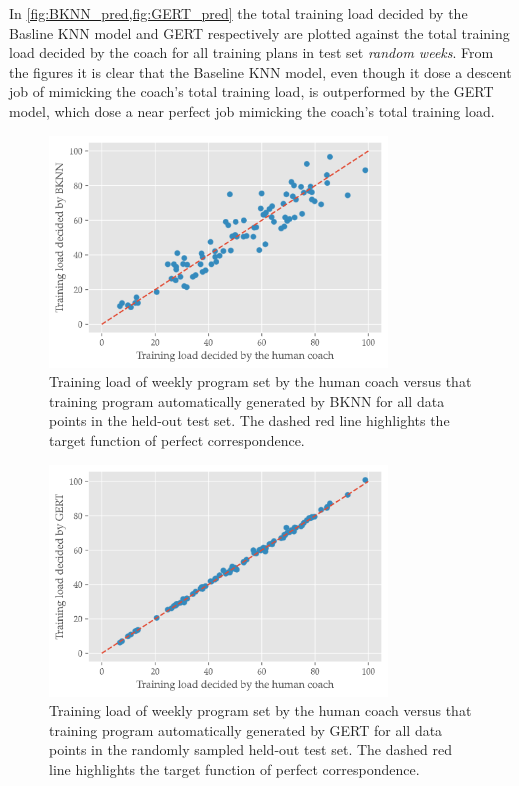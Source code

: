 In \cref{fig:BKNN_pred,fig:GERT_pred} the total training load decided by the Basline KNN model and GERT respectively are plotted against the total training load decided by the coach for all training plans in test set \textit{random weeks}.
From the figures it is clear that the Baseline KNN model, even though it dose a descent job of mimicking the coach's total training load, is outperformed by the GERT model, which dose a near perfect job mimicking the coach's total training load.

\begin{figure}[ht]
    \centering
    \includegraphics[width=0.8\textwidth]{chapters/figures/BKNN_predictions.png}
    \caption{Training load of weekly program set by the human coach versus that training program automatically generated by BKNN for all data points in the held-out test set. The dashed red line highlights the target function of perfect correspondence.}
    \label{fig:BKNN_pred}
\end{figure}

\begin{figure}[ht]
    \centering
    \includegraphics[width=0.8\textwidth]{chapters/figures/GERT_predictions.png}
    \caption{Training load of weekly program set by the human coach versus that training program automatically generated by GERT for all data points in the randomly sampled held-out test set. The dashed red line highlights the target function of perfect correspondence.}
    \label{fig:GERT_pred}
\end{figure}

